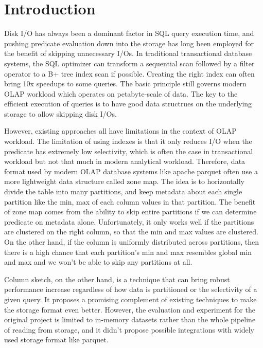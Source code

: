 \section{Introduction}

Disk I/O has always been a dominant factor in SQL query execution time, and pushing predicate evaluation down into the storage has long been employed for the benefit of skipping unnecessary I/Os.
In traditional transactional database systems, the SQL optimizer can transform a sequential scan followed by a filter operator to a B+ tree index scan if possible. 
Creating the right index can often bring 10x speedups to some queries. 
The basic principle still governs modern OLAP workload which operates on petabyte-scale of data.
The key to the efficient execution of queries is to have good data structrues on the underlying storage to allow skipping disk I/Os.

However, existing approaches all have limitations in the context of OLAP workload.
The limitation of using indexes is that it only reduces I/O when the predicate has extremely low selectivity, which is often the case in transactional workload but not that much in modern analytical workload.
Therefore, data format used by modern OLAP database systems like apache parquet\cite{Parquet} often use a more lightweight data structure called zone map.
The idea is to horizontally divide the table into many partitions, and keep metadata about each single partition like the min, max of each column values in that partition.
The benefit of zone map comes from the ability to skip entire partitions if we can determine predicate on metadata alone. 
Unfortunately, it only works well if the partitions are clustered on the right column, so that the min and max values are clustered.
On the other hand, if the column is uniformly distributed across partitions, then there is a high chance that each partition's min and max resembles global min and max and we won't be able to skip any partitions at all.

Column sketch, on the other hand, is a technique that can bring robust performance increase regardless of how data is partitioned or the selectivity of a given query\cite{Brian18}.
It proposes a promising complement of existing techniques to make the storage format even better.
However, the evaluation and experiment for the original project is limited to in-memory datasets rather than the whole pipeline of reading from storage, and it didn't propose possible integrations with widely used storage format like parquet.

